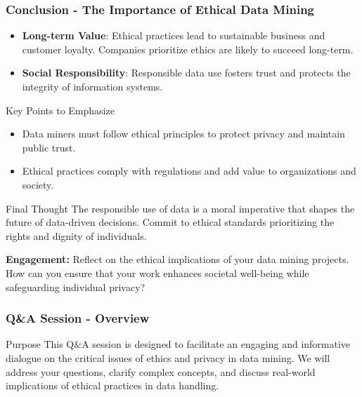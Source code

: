 \documentclass{beamer}
\begin{document}
\begin{frame}[fragile]
    \frametitle{Conclusion - The Importance of Ethical Data Mining}
    
    \begin{itemize}
        \item \textbf{Long-term Value}: Ethical practices lead to sustainable business and customer loyalty. Companies prioritize ethics are likely to succeed long-term.
        \item \textbf{Social Responsibility}: Responsible data use fosters trust and protects the integrity of information systems.
    \end{itemize}
    
    \begin{block}{Key Points to Emphasize}
        \begin{itemize}
            \item Data miners must follow ethical principles to protect privacy and maintain public trust.
            \item Ethical practices comply with regulations and add value to organizations and society.
        \end{itemize}
    \end{block}

    \begin{block}{Final Thought}
        The responsible use of data is a moral imperative that shapes the future of data-driven decisions. Commit to ethical standards prioritizing the rights and dignity of individuals.
    \end{block}

    \textbf{Engagement:} Reflect on the ethical implications of your data mining projects. How can you ensure that your work enhances societal well-being while safeguarding individual privacy?
\end{frame}

\begin{frame}[fragile]
    \frametitle{Q\&A Session - Overview}
    \begin{block}{Purpose}
        This Q\&A session is designed to facilitate an engaging and informative dialogue on 
        the critical issues of ethics and privacy in data mining. We will address your questions, 
        clarify complex concepts, and discuss real-world implications of ethical practices in 
        data handling.
    \end{block}
\end{frame}
\end{document}

